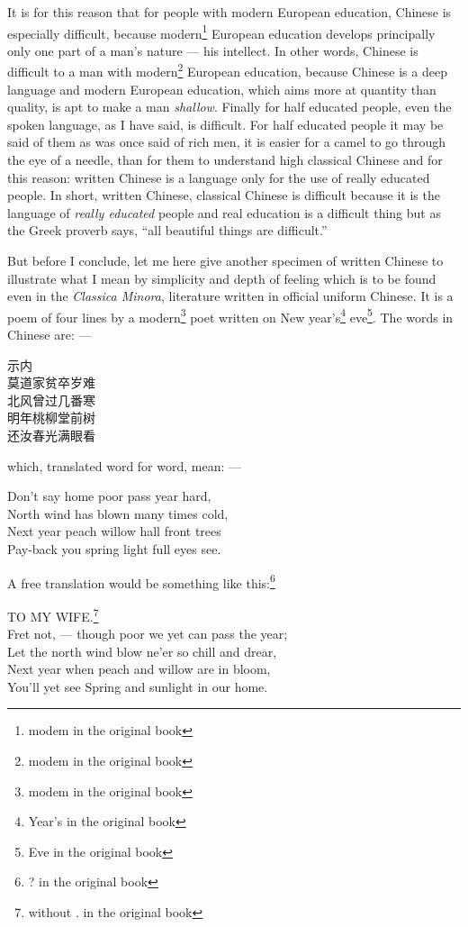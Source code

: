 It is for this reason that for people with modern European education, Chinese is especially difficult, because modern\footnote{modem in the original book} European education develops principally only one part of a man's nature --- his intellect.
In other words, Chinese is difficult to a man with modern\footnote{modem in the original book} European education, because Chinese is a deep language and modern European education, which aims more at quantity than quality, is apt to make a man \emph{shallow}.
Finally for half educated people, even the spoken language, as I have said, is difficult.
For half educated people it may be said of them as was once said of rich men, it is easier for a camel to go through the eye of a needle, than for them to understand high classical Chinese and for this reason: written Chinese is a language only for the use of really educated people.
In short, written Chinese, classical Chinese is difficult because it is the language of \emph{really educated} people and real education is a difficult thing but as the Greek proverb says, ``all beautiful things are difficult.''

But before I conclude, let me here give another specimen of written Chinese to illustrate what I mean by simplicity and depth of feeling which is to be found even in the \emph{Classica Minora}, literature written in official uniform Chinese.
It is a poem of four lines by a modern\footnote{modem in the original book} poet written on New year's\footnote{Year's in the original book} eve\footnote{Eve in the original book}.
The words in Chinese are: ---
\begin{center}
    示内 \\
    莫道家贫卒岁难 \\
    北风曾过几番寒 \\
    明年桃柳堂前树 \\
    还汝春光满眼看 \\
\end{center}
which, translated word for word, mean: ---
\begin{center}
    Don't say home poor pass year hard, \\
    North wind has blown many times cold, \\
    Next year peach willow hall front trees \\
    Pay-back you spring light full eyes see. \\
\end{center}
A free translation would be something like this:\footnote{? in the original book}
\begin{center}
    TO MY WIFE.\footnote{without . in the original book} \\
    Fret not, --- though poor we yet can pass the year; \\
    Let the north wind blow ne'er so chill and drear, \\
    Next year when peach and willow are in bloom, \\
    You'll yet see Spring and sunlight in our home.
\end{center}

